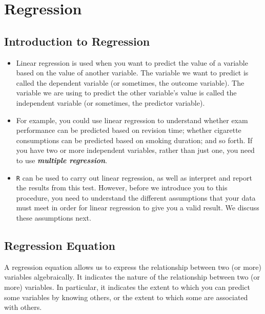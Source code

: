 \documentclass[]{report}
\begin{document}

\chapter{Regression}



			\section{Introduction to Regression}
			
			\begin{itemize}
				\item Linear regression is used when you want to predict the value of a variable based on the value of another variable. The variable we want to predict is called the dependent variable (or sometimes, the outcome variable). The variable we are using to predict the other variable's value is called the independent variable (or sometimes, the predictor variable).
				
				
				\item For example, you could use linear regression to understand whether exam performance can be predicted based on revision time; whether cigarette consumptions can be predicted based on smoking duration; and so forth. If you have two or more independent variables, rather than just one, you need to use \textbf{\textit{multiple regression}}.
				
				\item	\texttt{R} can be used to carry out linear regression, as well as interpret and report the results from this test. However, before we introduce you to this procedure, you need to understand the different assumptions that your data must meet in order for linear regression to give you a valid result. We discuss these assumptions next.
				
			\end{itemize}
			
			
			
			










\section{Regression Equation}
A regression equation allows us to express the relationship between two (or more) variables algebraically. It indicates the nature of the relationship between two (or more) variables. In particular, it indicates the extent to which you can predict some variables by knowing others, or the extent to which some are associated with others.
\end{document}
